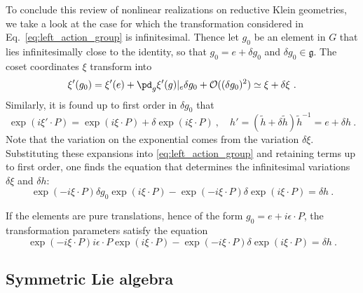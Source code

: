 \documentclass[11pt]{article}
\begin{document}
\blankline\noindent
To conclude this review of nonlinear realizations on reductive 
Klein geometries, we take a look at the case for which the 
transformation considered in Eq.~\eqref{eq:left_action_group} is 
infinitesimal. Thence let $g_0$ be an element in $G$ that lies 
infinitesimally close to the identity, so that $g_0 = e + \delta 
g_0$ and $\delta g_0 \in \mathfrak{g}$. The coset coordinates 
$\xi$ transform into
\begin{displaymath}
	\xi'(g_0) = \xi'(e) + \pd_g \xi'(g)|_e \delta g_0 + 
	\mathcal{O}((\delta g_0)^2) \simeq \xi + \delta \xi~.
\end{displaymath}
Similarly, it is found up to first order in $\delta g_0$ that
\begin{displaymath}
	\exp(i\xi'\cdot P) = \exp(i\xi\cdot P) + \delta\exp(i\xi\cdot 
	P)~,
	\quad
	h' = (\tilde{h} + \delta \tilde{h})\tilde{h}^{-1} = e + \delta 
	h~.
\end{displaymath}
Note that the variation on the exponential comes from the 
variation $\delta \xi$. Substituting these expansions into 
\eqref{eq:left_action_group} and retaining terms up to first 
order, one finds the equation that determines the infinitesimal 
variations $\delta \xi$ and $\delta h$: 
%
\begin{displaymath}
	\exp(-i\xi\cdot P) \delta g_0 \exp(i\xi\cdot P) - 
	\exp(-i\xi\cdot P) \delta\exp(i\xi\cdot P) = \delta h~.
\end{displaymath}

If the elements are pure translations, hence of the form $g_0 = e 
+ i\epsilon\cdot P$, the transformation parameters satisfy the 
equation
\begin{equation}\label{eq:nonlin_trafo_inf}
	\exp(-i\xi\cdot P) i\epsilon\cdot P \exp(i\xi\cdot P) - 
	\exp(-i\xi\cdot P) \delta\exp(i\xi\cdot P) = \delta h~.
\end{equation}


\subsection{Symmetric Lie algebra}
\end{document}
